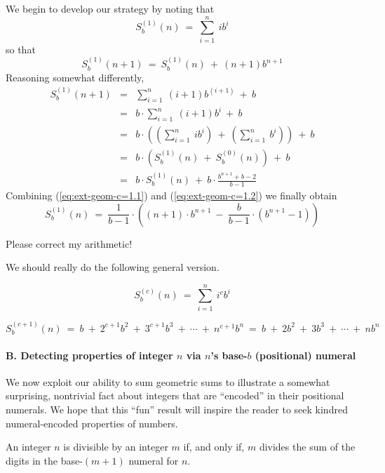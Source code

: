 We begin to develop our strategy by noting that
\[ S_b^{(1)}(n) \ = \ \sum_{i=1}^n \ i b^i  \]
so that
\begin{equation}
\label{eq:ext-geom-c=1.1}
S_b^{(1)}(n+1) \ = \ S_b^{(1)}(n) \ + \ (n+1) b^{n+1}
\end{equation}
Reasoning somewhat differently,
\begin{eqnarray*}
S_b^{(1)}(n+1)
     & = &
\sum_{i=1}^n \ (i+1) b^{(i+1)} \ + \ b \\
     & = &
b \cdot \sum_{i=1}^n \ (i+1) b^i \ + \ b \\
     & = &
b \cdot \left(
\left(\sum_{i=1}^n \ i b^i \right)
 \ + \
\left( \sum_{i=1}^n \  b^i \right)
\right) \ + \ b \\
     & = &
b \cdot \left( S_b^{(1)}(n) \ + \ S_b^{(0)}(n) \right) \ + \ b \\
\label{eq:ext-geom-c=1.2}
    & = &
b \cdot S_b^{(1)}(n) \ + \ b \cdot \frac{b^{n+1} + b - 2}{b-1}
\end{eqnarray*}
Combining (\ref{eq:ext-geom-c=1.1}) and (\ref{eq:ext-geom-c=1.2}) we
finally obtain
\[ S_b^{(1)}(n) \ = \
\frac{1}{b-1} \cdot \left(
(n+1) \cdot b^{n+1}
  \ - \
\frac{b}{b-1} \cdot (b^{n+1} - 1)
\right)
\]

{\Arny Please correct my arithmetic!}


{\Arny We should really do the following general version.}

\[
S_b^{(c)}(n) \ = \ \sum_{i=1}^n \ i^c b^i
\]

\[
S_b^{(c+1)}(n)
 \ = \
b \ + \ 2^{c+1} b^2\ + \ 3^{c+1} b^3 \ + \ \cdots \ + \ n^{c+1} b^n
 \ = \
b \ + \ 2 b^2\ + \ 3 b^3 \ + \ \cdots \ + \ n b^n
\]




\paragraph{B. Detecting properties of integer $n$ via $n$'s base-$b$ (positional) numeral}

We now exploit our ability to sum geometric sums to illustrate a
somewhat surprising, nontrivial fact about integers that are
``encoded'' in their positional numerals.  We hope that this ``fun''
result will inspire the reader to seek kindred numeral-encoded
properties of numbers.

\begin{prop}
\label{thm:div-by-b-bar}
An integer $n$ is divisible by an integer $m$ if, and only if, $m$
divides the sum of the digits in the base-$(m+1)$ numeral for $n$.
\end{prop}

